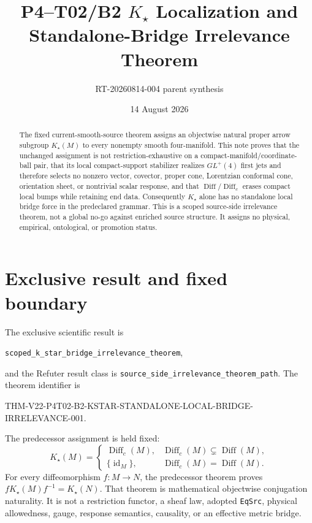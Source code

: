 \documentclass[11pt]{article}
\title{P4--T02/B2 $K_{\star}$ Localization and\\ Standalone-Bridge Irrelevance Theorem}
\author{RT-20260814-004 parent synthesis}
\date{14 August 2026}
\newcommand{\Diff}{\operatorname{Diff}}
\newcommand{\Diffc}{\operatorname{Diff}_{c}}
\newcommand{\Kstar}{K_{\star}}
\begin{document}
\maketitle

\begin{abstract}
The fixed current-smooth-source theorem assigns an objectwise natural proper
arrow subgroup $\Kstar(M)$ to every nonempty smooth four-manifold.  This note
proves that the unchanged assignment is not restriction-exhaustive on a
compact-manifold/coordinate-ball pair, that its local compact-support
stabilizer realizes $GL^{+}(4)$ first jets and therefore selects no nonzero
vector, covector, proper cone, Lorentzian conformal cone, orientation sheet,
or nontrivial scalar response, and that $\Diff/\Diffc$ erases compact local
bumps while retaining end data.  Consequently $\Kstar$ alone has no
standalone local bridge force in the predeclared grammar.  This is a scoped
source-side irrelevance theorem, not a global no-go against enriched source
structure.  It assigns no physical, empirical, ontological, or promotion
status.
\end{abstract}

\section{Exclusive result and fixed boundary}

The exclusive scientific result is
\begin{center}
\texttt{scoped\_k\_star\_bridge\_irrelevance\_theorem},
\end{center}
and the Refuter result class is
\texttt{source\_side\_irrelevance\_theorem\_path}.  The theorem identifier is
\begin{center}
\small\ttfamily
THM-V22-P4T02-B2-KSTAR-STANDALONE-LOCAL-BRIDGE-IRRELEVANCE-001.
\end{center}

The predecessor assignment is held fixed:
\begin{equation}
\Kstar(M)=
\begin{cases}
\Diffc(M),&\Diffc(M)\subsetneq\Diff(M),\\
\{\operatorname{id}_{M}\},&\Diffc(M)=\Diff(M).
\end{cases}
\label{eq:kstar}
\end{equation}
For every diffeomorphism $f:M\to N$, the predecessor theorem proves
$f\Kstar(M)f^{-1}=\Kstar(N)$.  That theorem is mathematical objectwise
conjugation naturality.  It is not a restriction functor, a sheaf law,
adopted \texttt{EqSrc}, physical allowedness, gauge, response semantics,
causality, or an effective metric bridge.
\end{document}
